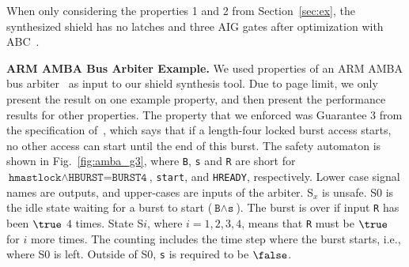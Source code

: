 \documentclass{llncs}
\begin{document}
When only considering the properties 1 and 2 from Section~\ref{sec:ex}, 
the synthesized shield has no latches and three AIG gates after 
optimization with ABC~\cite{BraytonM10}.

\noindent
\textbf{ARM AMBA Bus Arbiter Example.}
We used properties of an ARM AMBA bus arbiter~\cite{BloemJPPS12} as 
input to our shield synthesis tool.  Due to page limit, we only present 
the result on one example property, and then present the performance 
results for other properties. 
The property that we enforced was Guarantee 3 from the specification 
of~\cite{BloemJPPS12}, which says that if a length-four locked burst 
access starts, no other access can start until the end of this burst. 
The safety automaton is shown in Fig.~\ref{fig:amba_g3}, where 
\texttt{B}, \texttt{s} and \texttt{R} are short for $\texttt{hmastlock} 
\wedge \texttt{HBURST=BURST4}$, \texttt{start}, and \texttt{HREADY}, 
respectively.  Lower case signal names are outputs, and upper-cases are 
inputs of the arbiter.  S$_x$ is unsafe. S0 is the idle state waiting 
for a burst to start ($\texttt{B} \wedge \texttt{s}$). The burst is over 
if input \texttt{R} has been $\true$ $4$ times.  State S$i$, where 
$i=1,2,3,4$, means that \texttt{R} must be $\true$ for $i$ more times.  
The counting includes the time step where the burst starts, i.e., where 
S0 is left.  Outside of S0, \texttt{s} is required to be $\false$.
\end{document}
